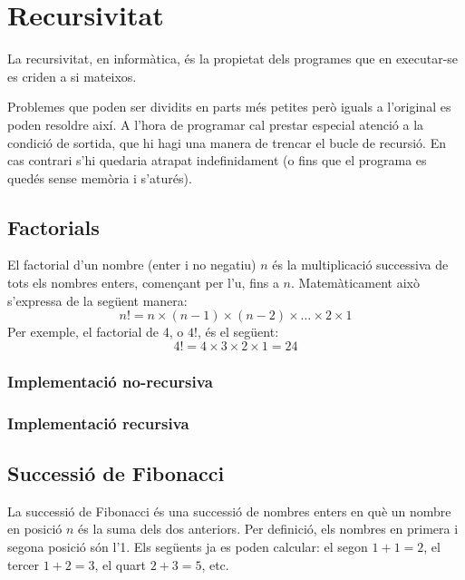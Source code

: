 \chapter{Recursivitat}

La recursivitat, en informàtica, és la propietat dels programes que en executar-se es criden a si mateixos.

Problemes que poden ser dividits en parts més petites però iguals a l'original es poden resoldre així.
A l'hora de programar cal prestar especial atenció a la condició de sortida, que hi hagi una manera de trencar el bucle de recursió. En cas contrari s'hi quedaria atrapat indefinidament (o fins que el programa es quedés sense memòria i s'aturés).

\section{Factorials}
El factorial d'un nombre (enter i no negatiu) $n$ és la multiplicació successiva de tots els nombres enters, començant per l'u, fins a $n$.
Matemàticament això s'expressa de la següent manera:
\begin{equation*}
	n! = n \times (n-1) \times (n-2) \times \ldots \times 2 \times 1 
\end{equation*}
Per exemple, el factorial de 4, o $4!$, és el següent:
\begin{equation*}
	4! = 4 \times 3 \times 2 \times 1 = 24 
\end{equation*}

\subsection{Implementació no-recursiva}


\subsection{Implementació recursiva}


\section{Successió de Fibonacci}
La successió de Fibonacci és una successió de nombres enters en què un nombre en posició $n$ és la suma dels dos anteriors.
Per definició, els nombres en primera i segona posició són l'1. Els següents ja es poden calcular: el segon $1 + 1 = 2$, el tercer $1 + 2 = 3$, el quart $2 + 3 = 5$, etc.


